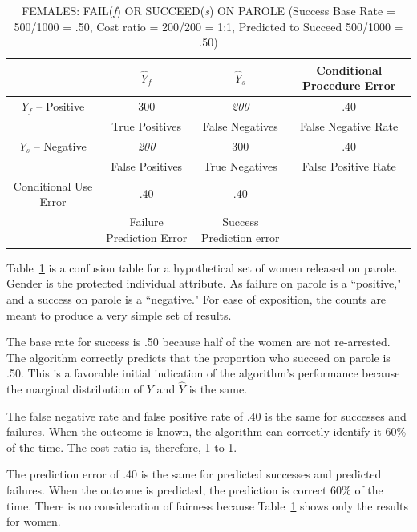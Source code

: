 \documentclass[12pt]{article}
\begin{document}
\begin{table}[htp]
\caption{FEMALES: FAIL(\textit{f}) OR SUCCEED(\textit{s}) ON PAROLE  (Success Base Rate = 500/1000 = .50, Cost ratio = 200/200 = 1:1, Predicted to Succeed 500/1000 = .50)}
\begin{center}
\tiny
\begin{tabular}{|c|c|c|c|}
\hline 
      & $\hat{Y}_{f}$ & $\hat{Y}_{s}$ & Conditional Procedure Error  \\ \hline
 $Y_{f}$ -- Positive  & 300 & \textit{200} & .40 \\
      & True Positives & False Negatives & False  Negative Rate\\   \hline 
 $Y_{s}$  -- Negative & \textit{200} & 300 & .40 \\
      & False Positives & True Negatives & False Positive Rate  \\  \hline
 Conditional Use Error & .40 & .40 & \\ 
      & Failure Prediction Error & Success Prediction error & \\
 \hline
\end{tabular}
\end{center}
\label{tab:females}
\end{table}

Table~\ref{tab:females} is a confusion table for a hypothetical set of women released on parole. Gender is the protected individual attribute.  As failure on parole is a ``positive," and a success on parole is a ``negative." For ease of exposition, the counts are meant to produce a very simple set of results. 

The base rate for success is .50 because half of the women are not re-arrested. The algorithm correctly predicts that the proportion who succeed on parole is .50. This is a favorable initial
 indication of the algorithm's performance because the marginal distribution of $Y$ and $\hat{Y}$ is the same. 

The false negative rate and false positive rate of .40 is the same for successes and failures. When the outcome is known, the algorithm can correctly identify it 60\% of the time. The cost ratio is, therefore, 1 to 1.

The prediction error of .40 is the same for predicted successes  and predicted failures.
When the outcome is predicted, the prediction is correct 60\% of the time.   There is no consideration of fairness because Table~\ref{tab:females} shows only the results for women.
\end{document}
